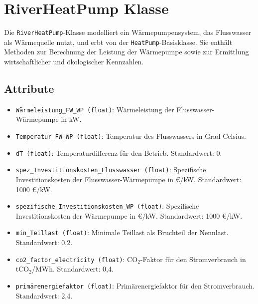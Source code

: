 \section{RiverHeatPump Klasse}
Die \texttt{RiverHeatPump}-Klasse modelliert ein Wärmepumpensystem, das Flusswasser als Wärmequelle nutzt, und erbt von der \texttt{HeatPump}-Basisklasse. Sie enthält Methoden zur Berechnung der Leistung der Wärmepumpe sowie zur Ermittlung wirtschaftlicher und ökologischer Kennzahlen.

\subsection{Attribute}
\begin{itemize}
    \item \texttt{Wärmeleistung\_FW\_WP (float)}: Wärmeleistung der Flusswasser-Wärmepumpe in kW.
    \item \texttt{Temperatur\_FW\_WP (float)}: Temperatur des Flusswassers in Grad Celsius.
    \item \texttt{dT (float)}: Temperaturdifferenz für den Betrieb. Standardwert: 0.
    \item \texttt{spez\_Investitionskosten\_Flusswasser (float)}: Spezifische Investitionskosten der Flusswasser-Wärmepumpe in €/kW. Standardwert: 1000 €/kW.
    \item \texttt{spezifische\_Investitionskosten\_WP (float)}: Spezifische Investitionskosten der Wärmepumpe in €/kW. Standardwert: 1000 €/kW.
    \item \texttt{min\_Teillast (float)}: Minimale Teillast als Bruchteil der Nennlast. Standardwert: 0,2.
    \item \texttt{co2\_factor\_electricity (float)}: CO$_2$-Faktor für den Stromverbrauch in tCO$_2$/MWh. Standardwert: 0,4.
    \item \texttt{primärenergiefaktor (float)}: Primärenergiefaktor für den Stromverbrauch. Standardwert: 2,4.
\end{itemize}

